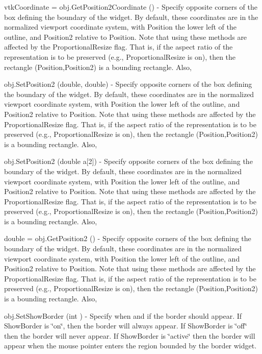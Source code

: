 \begin{DoxyItemize}
\item {\ttfamily vtk\-Coordinate = obj.\-Get\-Position2\-Coordinate ()} -\/ Specify opposite corners of the box defining the boundary of the widget. By default, these coordinates are in the normalized viewport coordinate system, with Position the lower left of the outline, and Position2 relative to Position. Note that using these methods are affected by the Proportional\-Resize flag. That is, if the aspect ratio of the representation is to be preserved (e.\-g., Proportional\-Resize is on), then the rectangle (Position,Position2) is a bounding rectangle. Also,  
\item {\ttfamily obj.\-Set\-Position2 (double, double)} -\/ Specify opposite corners of the box defining the boundary of the widget. By default, these coordinates are in the normalized viewport coordinate system, with Position the lower left of the outline, and Position2 relative to Position. Note that using these methods are affected by the Proportional\-Resize flag. That is, if the aspect ratio of the representation is to be preserved (e.\-g., Proportional\-Resize is on), then the rectangle (Position,Position2) is a bounding rectangle. Also,  
\item {\ttfamily obj.\-Set\-Position2 (double a\mbox{[}2\mbox{]})} -\/ Specify opposite corners of the box defining the boundary of the widget. By default, these coordinates are in the normalized viewport coordinate system, with Position the lower left of the outline, and Position2 relative to Position. Note that using these methods are affected by the Proportional\-Resize flag. That is, if the aspect ratio of the representation is to be preserved (e.\-g., Proportional\-Resize is on), then the rectangle (Position,Position2) is a bounding rectangle. Also,  
\item {\ttfamily double = obj.\-Get\-Position2 ()} -\/ Specify opposite corners of the box defining the boundary of the widget. By default, these coordinates are in the normalized viewport coordinate system, with Position the lower left of the outline, and Position2 relative to Position. Note that using these methods are affected by the Proportional\-Resize flag. That is, if the aspect ratio of the representation is to be preserved (e.\-g., Proportional\-Resize is on), then the rectangle (Position,Position2) is a bounding rectangle. Also,  
\item {\ttfamily obj.\-Set\-Show\-Border (int )} -\/ Specify when and if the border should appear. If Show\-Border is \char`\"{}on\char`\"{}, then the border will always appear. If Show\-Border is \char`\"{}off\char`\"{} then the border will never appear. If Show\-Border is \char`\"{}active\char`\"{} then the border will appear when the mouse pointer enters the region bounded by the border widget.  

\end{DoxyItemize}
